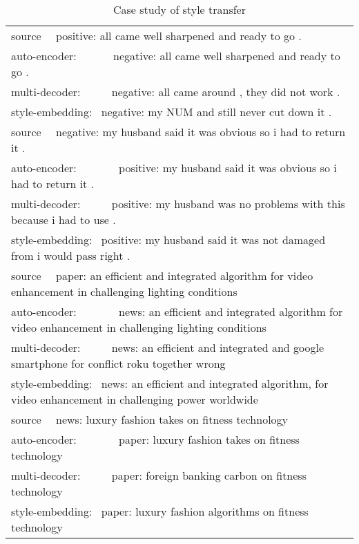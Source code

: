 \documentclass[letterpaper]{article} \usepackage{aaai18}  \usepackage{times}  \usepackage{helvet}  \usepackage{courier}  \usepackage{url}  \usepackage{graphicx}  \usepackage{amsmath}
\begin{document}
\begin{table*}[t]
\centering
\begin{tabular}{l}
\hline
source~~ positive: all came well sharpened and ready to go .                                                             \\
auto-encoder:~~~~~~  negative: all came well sharpened and ready to go .            \\
multi-decoder:~~~~~  negative: all came around , they did not work .            \\ 
style-embedding:~  negative: my NUM and still never cut down it .       \\ \hline
source~~ negative: my husband said it was obvious so i had to return it .                                                \\
auto-encoder:~~~~~~~  positive: my husband said it was obvious so i had to return it .              \\
multi-decoder:~~~~~  positive: my husband was no problems with this because i had to use .       \\ 
style-embedding:~  positive: my husband said it was not damaged from i would pass right .         \\ \hline
source~~ paper: an efficient and integrated algorithm for video enhancement in challenging lighting conditions          \\ 
auto-encoder:~~~~~~~  news: an efficient and integrated algorithm for video enhancement in challenging lighting conditions\\
multi-decoder:~~~~~  news: an efficient and integrated and google smartphone for conflict roku together wrong   \\
style-embedding:~  news: an efficient and integrated algorithm, for video enhancement in challenging power worldwide \\ \hline
source~~ news: luxury fashion takes on fitness technology                                                      \\
auto-encoder:~~~~~~~  paper: luxury fashion takes on fitness technology                            \\
multi-decoder:~~~~~ paper: foreign banking carbon on fitness technology              \\
style-embedding:~  paper: luxury fashion algorithms on fitness technology          \\ \hline
\end{tabular}
\caption{Case study of style transfer}
\label{table_show_case}
\end{table*}
\end{document}
